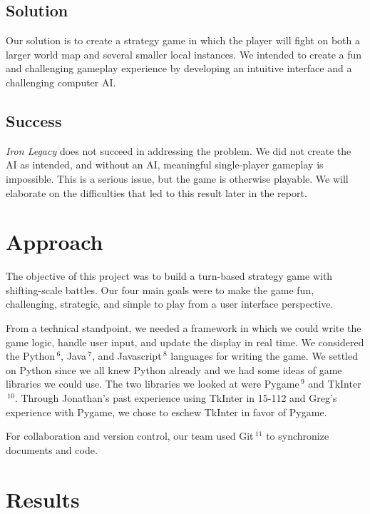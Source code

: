 \documentclass{article}
\begin{document}
\subsection*{Solution}
Our solution is to create a strategy game in which the player will fight on
both a larger world map and several smaller local instances.
We intended to create a fun and challenging gameplay experience by developing
an intuitive interface and a challenging computer AI.

\subsection*{Success}
\emph{Iron Legacy} does not succeed in addressing the problem.
We did not create the AI as intended, and without an AI, meaningful 
single-player gameplay is impossible.
This is a serious issue, but the game is otherwise playable.
We will elaborate on the difficulties that led to this result later in the 
report.

\section*{Approach}
The objective of this project was to build a turn-based strategy game with 
shifting-scale battles.
Our four main goals were to make the game fun, challenging, strategic, and 
simple to play from a user interface perspective.

From a technical standpoint, we needed a framework in which we could write the
game logic, handle user input, and update the display in real time.
We considered the Python$\,^6$, Java$\,^7$, and 
Javascript$\,^8$ languages for writing the game. 
We settled on Python since we all knew Python already and we had some ideas of
game libraries we could use.
The two libraries we looked at were Pygame$\,^9$ and 
TkInter$\,^{10}$.
Through Jonathan's past experience using TkInter in 15-112 and Greg's 
experience with Pygame, we chose to eschew TkInter in favor of Pygame.

For collaboration and version control, our team used Git$\,^{11}$ to
synchronize documents and code.

\section*{Results}
\end{document}
